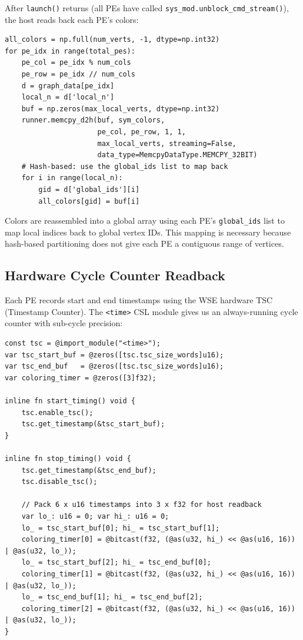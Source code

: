 \documentclass[11pt,letterpaper]{article}
\begin{document}
After \texttt{launch()} returns (all PEs have called \texttt{sys\_mod.unblock\_cmd\_stream()}), the host reads back each PE's colors:

\begin{lstlisting}[language=PyHost, caption={Color readback (from \texttt{cerebras\_host.py})}, label=lst:d2h]
all_colors = np.full(num_verts, -1, dtype=np.int32)
for pe_idx in range(total_pes):
    pe_col = pe_idx % num_cols
    pe_row = pe_idx // num_cols
    d = graph_data[pe_idx]
    local_n = d['local_n']
    buf = np.zeros(max_local_verts, dtype=np.int32)
    runner.memcpy_d2h(buf, sym_colors,
                      pe_col, pe_row, 1, 1,
                      max_local_verts, streaming=False,
                      data_type=MemcpyDataType.MEMCPY_32BIT)
    # Hash-based: use the global_ids list to map back
    for i in range(local_n):
        gid = d['global_ids'][i]
        all_colors[gid] = buf[i]
\end{lstlisting}

Colors are reassembled into a global array using each PE's \texttt{global\_ids} list to map local indices back to global vertex IDs. This mapping is necessary because hash-based partitioning does not give each PE a contiguous range of vertices.

\subsection{Hardware Cycle Counter Readback}

Each PE records start and end timestamps using the WSE hardware TSC (Timestamp Counter). The \texttt{<time>} CSL module gives us an always-running cycle counter with sub-cycle precision:

\begin{lstlisting}[language=CSL, caption={TSC timing (from \texttt{pe\_program.csl})}, label=lst:tsc]
const tsc = @import_module("<time>");
var tsc_start_buf = @zeros([tsc.tsc_size_words]u16);
var tsc_end_buf   = @zeros([tsc.tsc_size_words]u16);
var coloring_timer = @zeros([3]f32);

inline fn start_timing() void {
    tsc.enable_tsc();
    tsc.get_timestamp(&tsc_start_buf);
}

inline fn stop_timing() void {
    tsc.get_timestamp(&tsc_end_buf);
    tsc.disable_tsc();

    // Pack 6 x u16 timestamps into 3 x f32 for host readback
    var lo_: u16 = 0; var hi_: u16 = 0;
    lo_ = tsc_start_buf[0]; hi_ = tsc_start_buf[1];
    coloring_timer[0] = @bitcast(f32, (@as(u32, hi_) << @as(u16, 16)) | @as(u32, lo_));
    lo_ = tsc_start_buf[2]; hi_ = tsc_end_buf[0];
    coloring_timer[1] = @bitcast(f32, (@as(u32, hi_) << @as(u16, 16)) | @as(u32, lo_));
    lo_ = tsc_end_buf[1]; hi_ = tsc_end_buf[2];
    coloring_timer[2] = @bitcast(f32, (@as(u32, hi_) << @as(u16, 16)) | @as(u32, lo_));
}
\end{lstlisting}
\end{document}
